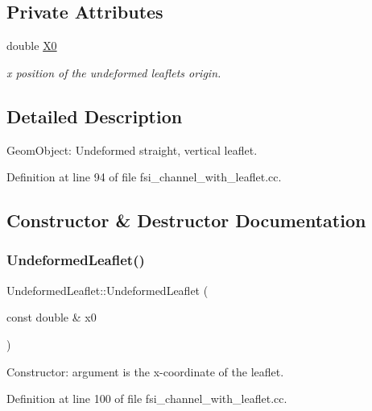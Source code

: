 \subsection*{Private Attributes}
\begin{DoxyCompactItemize}
\item 
double \hyperlink{classUndeformedLeaflet_aa89fc695af9e53aa38894c9d875afd36}{X0}
\begin{DoxyCompactList}\small\item\em x position of the undeformed leaflet\textquotesingle{}s origin. \end{DoxyCompactList}\end{DoxyCompactItemize}


\subsection{Detailed Description}
Geom\+Object\+: Undeformed straight, vertical leaflet. 

Definition at line 94 of file fsi\+\_\+channel\+\_\+with\+\_\+leaflet.\+cc.



\subsection{Constructor \& Destructor Documentation}
\mbox{\label{classUndeformedLeaflet_ac4c0478b1f329360684af14b59043b12}} 
\subsubsection{\texorpdfstring{Undeformed\+Leaflet()}{UndeformedLeaflet()}}
{\footnotesize\ttfamily Undeformed\+Leaflet\+::\+Undeformed\+Leaflet (\begin{DoxyParamCaption}\item[{const double \&}]{x0 }\end{DoxyParamCaption})\hspace{0.3cm}{\ttfamily [inline]}}



Constructor\+: argument is the x-\/coordinate of the leaflet. 



Definition at line 100 of file fsi\+\_\+channel\+\_\+with\+\_\+leaflet.\+cc.



